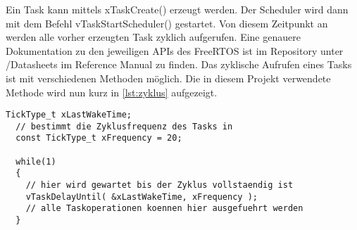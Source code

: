 Ein Task kann mittels xTaskCreate() erzeugt werden. Der Scheduler wird dann mit dem Befehl vTaskStartScheduler() gestartet. Von diesem Zeitpunkt an werden alle vorher erzeugten Task zyklich aufgerufen. Eine genauere Dokumentation zu den jeweiligen APIs des FreeRTOS ist im Repository unter /Datasheets im Reference Manual zu finden. Das zyklische Aufrufen eines Tasks ist mit verschiedenen Methoden möglich. Die in diesem Projekt verwendete Methode wird nun kurz in \ref{lst:zyklus} aufgezeigt.

\begin{lstlisting}[caption={Taskzyklus erzeugen}, label=lst:zyklus]
  TickType_t xLastWakeTime;
  // bestimmt die Zyklusfrequenz des Tasks in
  const TickType_t xFrequency = 20;  
  
  while(1)
  {
    // hier wird gewartet bis der Zyklus vollstaendig ist
    vTaskDelayUntil( &xLastWakeTime, xFrequency );
    // alle Taskoperationen koennen hier ausgefuehrt werden
  }
\end{lstlisting}



